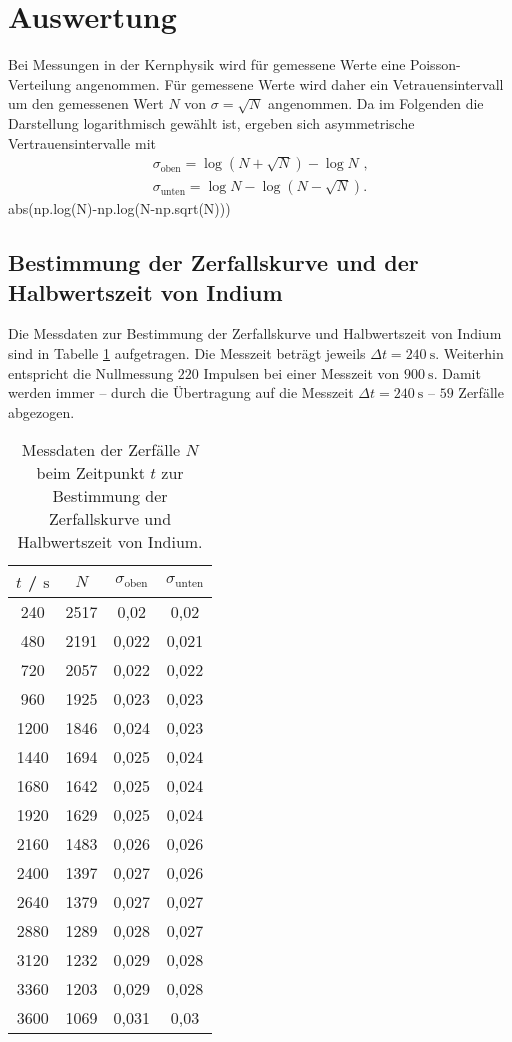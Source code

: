 \section{Auswertung}
\label{sec:Auswertung}
Bei Messungen in der Kernphysik wird für gemessene Werte eine Poisson-Verteilung angenommen.
Für gemessene Werte wird daher ein Vetrauensintervall um den gemessenen Wert $N$ von $\sigma=\sqrt{N}$ angenommen.
Da im Folgenden die Darstellung logarithmisch gewählt ist, ergeben sich asymmetrische Vertrauensintervalle mit
\begin{align}
	\sigma_\mathrm{oben}=\log{(N+\sqrt{N})}-\log{N}\text{ ,}\\
	\sigma_\mathrm{unten}=\log{N}-\log{(N-\sqrt{N})} \text{.}
\end{align}
abs(np.log(N)-np.log(N-np.sqrt(N)))
\subsection{Bestimmung der Zerfallskurve und der Halbwertszeit von Indium}
Die Messdaten zur Bestimmung der Zerfallskurve und Halbwertszeit von Indium sind in Tabelle
\ref{tab:indium} aufgetragen.
Die Messzeit beträgt jeweils $\Delta t = \SI{240}{\second}$.
Weiterhin entspricht die Nullmessung $220$ Impulsen bei einer Messzeit von $\SI{900}{\second}$.
Damit werden immer -- durch die Übertragung auf die Messzeit $\Delta t = \SI{240}{\second}$ --
$59$ Zerfälle abgezogen.
\begin{table}
	\centering
	\caption{Messdaten der Zerfälle $N$ beim Zeitpunkt $t$ zur Bestimmung der Zerfallskurve und Halbwertszeit von Indium.}
	\label{tab:indium}
	\begin{tabular}{cccc}
		\toprule
		$t$ / $\si{\second}$ & $N$ &$\sigma_\mathrm{oben}$ &$\sigma_\mathrm{unten}$\\
		\midrule
		240 & 2517 & 0,02 & 0,02 \\
		480 & 2191 & 0,022 & 0,021 \\
		720 & 2057 & 0,022 & 0,022 \\
		960 & 1925 & 0,023 & 0,023 \\
		1200 & 1846 & 0,024 & 0,023 \\
		1440 & 1694 & 0,025 & 0,024 \\
		1680 & 1642 & 0,025 & 0,024 \\
		1920 & 1629 & 0,025 & 0,024 \\
		2160 & 1483 & 0,026 & 0,026 \\
		2400 & 1397 & 0,027 & 0,026 \\
		2640 & 1379 & 0,027 & 0,027 \\
		2880 & 1289 & 0,028 & 0,027 \\
		3120 & 1232 & 0,029 & 0,028 \\
		3360 & 1203 & 0,029 & 0,028 \\
		3600 & 1069 & 0,031 & 0,03 \\
		\bottomrule
	\end{tabular}
\end{table}
